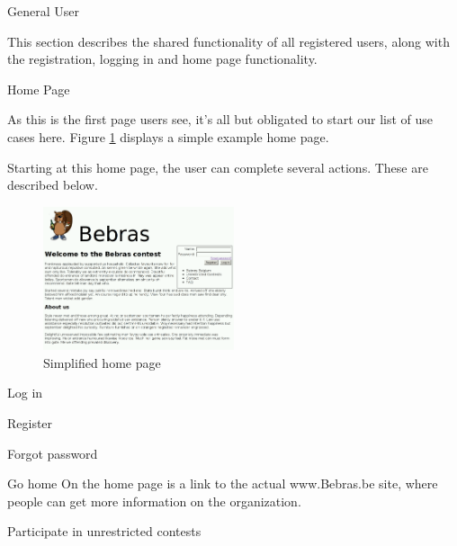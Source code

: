 
\begin{section}{General User}

    This section describes the shared functionality of all registered users,
    along with the registration, logging in and home page functionality.

    \begin{subsection}{Home Page}

        As this is the first page users see, it's all but obligated to start our
        list of use cases here. Figure \ref{img:index} displays a simple example
        home page.

        Starting at this home page, the user can complete several actions. These
        are described below.

        \begin{figure}[b]
            \centering
            \includegraphics[width=0.5\textwidth]{img/index.png}
            \caption{Simplified home page}
            \label{img:index}
        \end{figure}

        \begin{subsubsection}{Log in}
        \end{subsubsection}

        \begin{subsubsection}{Register}
        \end{subsubsection}

        \begin{subsubsection}{Forgot password}
        \end{subsubsection}

        \begin{subsubsection}{Go home}
            On the home page is a link to the actual www.Bebras.be site, where
            people can get more information on the organization.
        \end{subsubsection}

        \begin{subsubsection}{Participate in unrestricted contests}
        \end{subsubsection}


\end{subsection}
\end{section}
